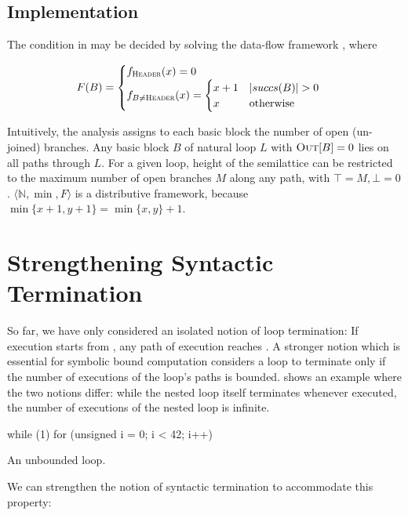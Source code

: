 \subsection{Implementation}
The condition in  may be decided by solving the data-flow framework , where

\[
    F(B) = \begin{cases}
        f_{\textsc{Header}}(x) = 0 \\
        f_{B \ne \textsc{Header}}(x) = \begin{cases}
            x+1 & |succs(B)| > 0 \\
            x & \text{otherwise}
        \end{cases}
    \end{cases}
\]

Intuitively, the analysis assigns to each basic block the number of open (un-joined) branches. Any basic block $B$ of natural loop $L$ with $\textsc{Out}[B] = 0$ lies on all paths through $L$. For a given loop, height of the semilattice can be restricted to the maximum number of open branches $M$ along any path, with $\top = M, \bot = 0$. $\langle \mathbb{N}, \min, F \rangle$ is a distributive framework, because $\min\{x+1,y+1\} = \min\{x,y\}+1$.

\section{Strengthening Syntactic Termination}

So far, we have only considered an isolated notion of loop termination: If execution starts from \entry{}, any path of execution reaches \exit{}. A stronger notion which is essential for symbolic bound computation considers a loop to terminate only if the number of executions of the loop's paths is bounded.  shows an example where the two notions differ: while the nested loop itself terminates whenever executed, the number of executions of the nested loop is infinite.

\begin{listing}
\begin{ccode}
while (1) {
    for (unsigned i = 0; i < 42; i++) {
    }
}
\end{ccode}
\caption{An unbounded loop.}
\label{lst:finitepaths}
\end{listing}

We can strengthen the notion of syntactic termination to accommodate this property:

